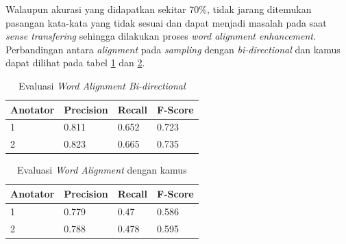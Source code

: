Walaupun akurasi yang didapatkan sekitar 70\%, tidak jarang ditemukan pasangan kata-kata yang tidak sesuai dan dapat menjadi masalah pada saat \textit{sense transfering} sehingga dilakukan proses \textit{word alignment enhancement}. Perbandingan antara \textit{alignment} pada \textit{sampling} dengan \textit{bi-directional} dan kamus dapat dilihat pada tabel \ref{table:word-alignment-evaluation-bidirectional} dan \ref{table:word-alignment-evaluation-kamus}.

\begin{table}
	\centering
	\caption{Evaluasi \textit{Word Alignment Bi-directional}}
	\label{table:word-alignment-evaluation-bidirectional}
	\begin{tabular}{|p{2cm}|p{2cm}|p{2cm}|p{2cm}|}
		\hline
		\textbf{Anotator} & \textbf{Precision} & \textbf{Recall} & \textbf{F-Score}
		\\ \hline
		1 & 0.811 & 0.652 & 0.723
		\\ \hline
		2 & 0.823 & 0.665 & 0.735
		\\ \hline
	\end{tabular} 
\end{table}

\begin{table}
	\centering
	\caption{Evaluasi \textit{Word Alignment} dengan kamus}
	\label{table:word-alignment-evaluation-kamus}
	\begin{tabular}{|p{2cm}|p{2cm}|p{2cm}|p{2cm}|}
		\hline
		\textbf{Anotator} & \textbf{Precision} & \textbf{Recall} & \textbf{F-Score}
		\\ \hline
		1 & 0.779 & 0.47 & 0.586
		\\ \hline
		2 & 0.788 & 0.478 & 0.595
		\\ \hline
	\end{tabular} 
\end{table}

